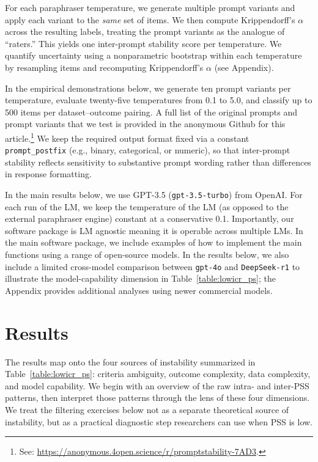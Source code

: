 \documentclass{article}
\begin{document}
For each paraphraser temperature, we generate multiple prompt variants and apply each variant to the \emph{same} set of items. We then compute Krippendorff's $\alpha$ across the resulting labels, treating the prompt variants as the analogue of ``raters.'' This yields one inter-prompt stability score per temperature. We quantify uncertainty using a nonparametric bootstrap within each temperature by resampling items and recomputing Krippendorff's $\alpha$ (see Appendix).

In the empirical demonstrations below, we generate ten prompt variants per temperature, evaluate twenty-five temperatures from 0.1 to 5.0, and classify up to 500 items per dataset--outcome pairing. A full list of the original prompts and prompt variants that we test is provided in the anonymous Github for this article.\footnote{See: \url{https://anonymous.4open.science/r/promptstability-7AD3}.} We keep the required output format fixed via a constant \texttt{prompt\_postfix} (e.g., binary, categorical, or numeric), so that inter-prompt stability reflects sensitivity to substantive prompt wording rather than differences in response formatting.

In the main results below, we use GPT-3.5 (\texttt{gpt-3.5-turbo}) from OpenAI. For each run of the LM, we keep the temperature of the LM (as opposed to the external paraphraser engine) constant at a conservative 0.1. Importantly, our software package is LM agnostic meaning it is operable across multiple LMs. In the main software package, we include examples of how to implement the main functions using a range of open-source models. In the results below, we also include a limited cross-model comparison between \texttt{gpt-4o} and \texttt{DeepSeek-r1} to illustrate the model-capability dimension in Table~\ref{table:lowicr_ps}; the Appendix provides additional analyses using newer commercial models.

\section{Results}

The results map onto the four sources of instability summarized in Table~\ref{table:lowicr_ps}: criteria ambiguity, outcome complexity, data complexity, and model capability. We begin with an overview of the raw intra- and inter-PSS patterns, then interpret those patterns through the lens of these four dimensions. We treat the filtering exercises below not as a separate theoretical source of instability, but as a practical diagnostic step researchers can use when PSS is low.
\end{document}
